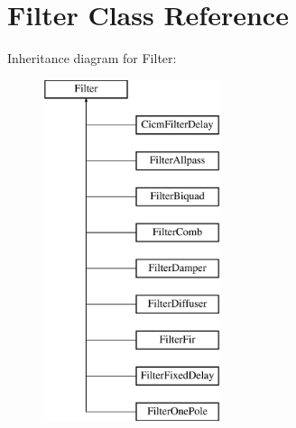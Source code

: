 \hypertarget{class_filter}{\section{Filter Class Reference}
\label{class_filter}
}
Inheritance diagram for Filter\-:\begin{figure}[H]
\begin{center}
\leavevmode
\includegraphics[height=10.000000cm]{class_filter}
\end{center}
\end{figure}

